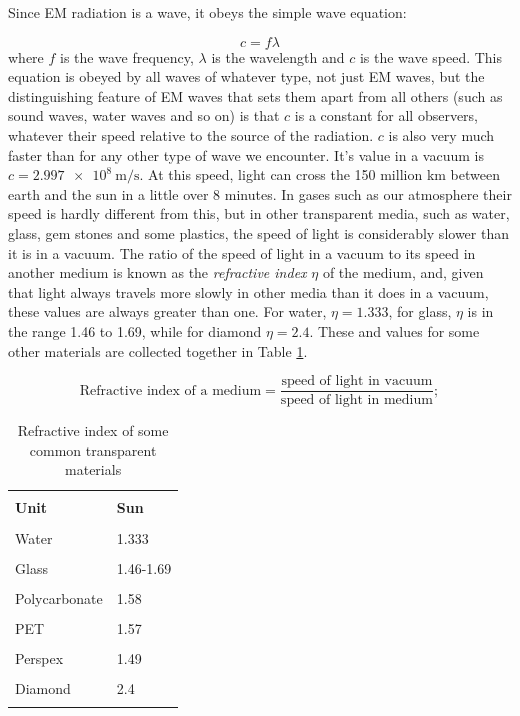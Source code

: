 \documentclass[class=scrartcl, crop=false,parskip=half]{standalone}
\begin{document}
Since EM radiation is a wave, it obeys the simple wave equation:

\begin{equation}
c=f\lambda
\label{eq:waveEquation}
\end{equation}
where $f$ is the wave frequency, $\lambda$ is the wavelength and $c$ is the wave speed. This equation is obeyed by all waves of whatever type, not just EM waves, but the distinguishing feature of EM waves that sets them apart from all others (such as sound waves, water waves and so on) is that $c$ is a constant for all observers, whatever their speed relative to the source of the radiation. $c$ is also very much faster than for  any other type of wave we encounter.  It's value in a vacuum is $c=\SI{2.997e8}{\metre\per\second}$. At this speed, light can cross the 150 million km between earth and the sun in a little over 8 minutes. In gases such as our atmosphere their speed is hardly different from this, but in other transparent media, such as water, glass, gem stones and some plastics, the speed of light is considerably slower than it is in a vacuum. The ratio of the speed of light in a vacuum to its speed in another medium is known as the \emph{refractive index} $\eta$ of the medium, and, given that light always travels more slowly in other media than it does in a vacuum, these values are always greater than one. For water, $\eta=1.333$, for glass, $\eta$ is in the range 1.46 to 1.69, while for diamond $\eta=2.4$. These and values for some other materials are collected together in Table \ref{tab:RefractiveIndices}.

\begin{equation}
\text{Refractive\ index\ of\ a\ medium}=\frac{\text{speed\ of\ light\ in\ vacuum}}{\text{speed\ of\ light\ in\ medium}};
\label{eq:refractive_index}
\end{equation}

\begin{table} 
\centering
\caption{Refractive index of some common transparent materials}
    \begin{tabular}{l l }
    \hline\\
    \textbf{Unit} & 	\textbf{Sun} \\
    \hline\\
    Water & 	1.333 \\
     \hline\\
    Glass& 	1.46-1.69 \\
    \hline\\
    Polycarbonate & 	1.58 \\
     \hline\\
    PET & 	1.57\\
    \hline\\
    Perspex & 	1.49\\
    \hline\\
    Diamond & 	2.4\\
    \hline\\
    \end{tabular}
\label{tab:RefractiveIndices}
\end{table}
\end{document}
